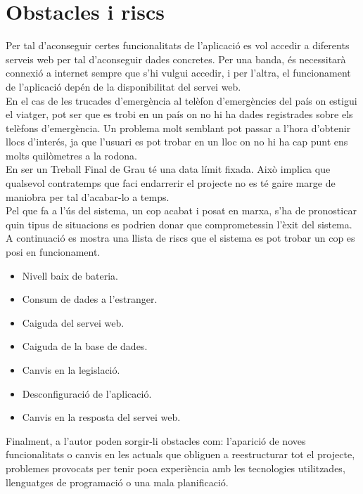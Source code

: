 \section{Obstacles i riscs}

Per tal d’aconseguir certes funcionalitats de l’aplicació es vol accedir a diferents serveis web per tal d’aconseguir dades concretes. Per una banda, és necessitarà connexió a internet sempre que s’hi vulgui accedir, i per l’altra, el funcionament de l’aplicació depén de la disponibilitat del servei web.\\

En el cas de les trucades d’emergència al telèfon d’emergències del país on estigui el viatger, pot ser que es trobi en un país on no hi ha dades registrades sobre els telèfons d’emergència. Un problema molt semblant pot passar a l’hora d’obtenir llocs d’interés, ja que l’usuari es pot trobar en un lloc on no hi ha cap punt ens molts quilòmetres a la rodona.\\

En ser un Treball Final de Grau té una data límit fixada. Això implica que qualsevol contratemps que faci endarrerir el projecte no es té gaire marge de maniobra per tal d’acabar-lo a temps.\\

Pel que fa a l’ús del sistema, un cop acabat i posat en marxa, s’ha de pronosticar quin tipus de situacions es podrien donar que comprometessin l’èxit del sistema. A continuació es mostra una llista de riscs que el sistema es pot trobar un cop es posi en funcionament.

\begin{itemize}
\item{}Nivell baix de bateria.
\item{}Consum de dades a l’estranger.
\item{}Caiguda del servei web.
\item{}Caiguda de la base de dades.
\item{}Canvis en la legislació.
\item{}Desconfiguració de l’aplicació.
\item{}Canvis en la resposta del servei web.
\end{itemize}

Finalment, a l’autor poden sorgir-li obstacles com: l’aparició de noves funcionalitats o canvis en les actuals que obliguen a reestructurar tot el projecte, problemes provocats per tenir poca experiència amb les tecnologies utilitzades, llenguatges de programació o una mala planificació.

